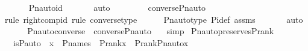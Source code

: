 \begin{isabellebody}
\ \ \ \ \isamarkupfalse%
\ Pn{\isacharunderscore}{\kern0pt}auto{\isacharunderscore}{\kern0pt}id\ \isanewline
\ \ \ \ \isamarkupfalse%
\ auto\ \isanewline
\ \ \isamarkupfalse%
\ \isamarkupfalse%
\ {\isachardoublequoteopen}{\isachardot}{\kern0pt}{\isachardot}{\kern0pt}{\isachardot}{\kern0pt}\ {\isacharequal}{\kern0pt}\ converse{\isacharparenleft}{\kern0pt}Pn{\isacharunderscore}{\kern0pt}auto{\isacharparenleft}{\kern0pt}{\isasympi}{\isacharparenright}{\kern0pt}{\isacharparenright}{\kern0pt}{\isachardoublequoteclose}\ \isanewline
\ \ \ \ \isamarkupfalse%
{\isacharparenleft}{\kern0pt}rule\ right{\isacharunderscore}{\kern0pt}comp{\isacharunderscore}{\kern0pt}id{\isacharcomma}{\kern0pt}\ rule\ converse{\isacharunderscore}{\kern0pt}type{\isacharparenright}{\kern0pt}\isanewline
\ \ \ \ \isamarkupfalse%
\ Pn{\isacharunderscore}{\kern0pt}auto{\isacharunderscore}{\kern0pt}type\ Pi{\isacharunderscore}{\kern0pt}def\ assms\ \isanewline
\ \ \ \ \isamarkupfalse%
\ auto\isanewline
\ \ \isamarkupfalse%
\ \isamarkupfalse%
\ {\isachardoublequoteopen}Pn{\isacharunderscore}{\kern0pt}auto{\isacharparenleft}{\kern0pt}converse{\isacharparenleft}{\kern0pt}{\isasympi}{\isacharparenright}{\kern0pt}{\isacharparenright}{\kern0pt}\ {\isacharequal}{\kern0pt}\ converse{\isacharparenleft}{\kern0pt}Pn{\isacharunderscore}{\kern0pt}auto{\isacharparenleft}{\kern0pt}{\isasympi}{\isacharparenright}{\kern0pt}{\isacharparenright}{\kern0pt}\ {\isachardoublequoteclose}\ \isamarkupfalse%
\ simp\isanewline
{}\isamarkupfalse%
%
\endisatagproof
{\isafoldproof}%
%
\isadelimproof
\isanewline
%
\endisadelimproof
\isanewline
{}\isamarkupfalse%
\ Pn{\isacharunderscore}{\kern0pt}auto{\isacharunderscore}{\kern0pt}preserves{\isacharunderscore}{\kern0pt}P{\isacharunderscore}{\kern0pt}rank\ {\isacharcolon}{\kern0pt}\ \isanewline
\ \ {\isachardoublequoteopen}is{\isacharunderscore}{\kern0pt}P{\isacharunderscore}{\kern0pt}auto{\isacharparenleft}{\kern0pt}{\isasympi}{\isacharparenright}{\kern0pt}\ {\isasymLongrightarrow}\ x\ {\isasymin}\ P{\isacharunderscore}{\kern0pt}names\ {\isasymLongrightarrow}\ P{\isacharunderscore}{\kern0pt}rank{\isacharparenleft}{\kern0pt}x{\isacharparenright}{\kern0pt}\ {\isacharequal}{\kern0pt}\ P{\isacharunderscore}{\kern0pt}rank{\isacharparenleft}{\kern0pt}Pn{\isacharunderscore}{\kern0pt}auto{\isacharparenleft}{\kern0pt}{\isasympi}{\isacharparenright}{\kern0pt}{\isacharbackquote}{\kern0pt}x{\isacharparenright}{\kern0pt}{\isachardoublequoteclose}\ \isanewline

\end{isabellebody}
